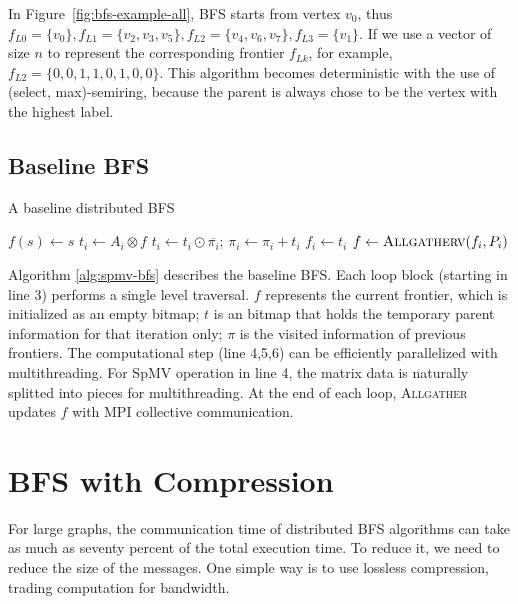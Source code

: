 \documentclass[conference]{IEEEtran}
\begin{document}
In Figure~\ref{fig:bfs-example-all}, BFS
starts from vertex $v_0$, thus $f_{L0}=\{v_0\},
f_{L1}=\{v_2,v_3,v_5\},f_{L2}=\{v_4,v_6,v_7\},f_{L3}=\{v_1\}$. If we use a
vector of size $n$ to represent the corresponding frontier $f_{Lk}$, for
example, $f_{L2}=\{0,0,1,1,0,1,0,0\}$. This algorithm
becomes deterministic with the use of (select, max)-semiring, because the
parent is always chose to be the vertex with the highest label. 

\subsection{Baseline BFS}
\label{sec:baseline-bfs-alg}

\begin{algorithm} [t] \label{alg:spmv-bfs}
\caption{A baseline distributed BFS}
$f(s) \gets s$\;
{
  {
    $t_{i} \gets A_{i} \otimes f $\;
    $t_{i} \gets t_{i} \odot \overline{\pi_{i}}$; $\pi_{i} \gets \pi_{i} + t_{i}$\;
    $f_{i} \gets t_{i}$\;
    $f \gets \textsc{Allgatherv}(f_i,P_i)$\;
  }
}
\end{algorithm}
Algorithm \ref{alg:spmv-bfs} describes the baseline BFS. Each loop block
(starting in line 3) performs a single level traversal. $f$ represents the
current frontier, which is initialized as an empty bitmap; $t$ is an bitmap
that holds the temporary parent information for that iteration only; $\pi$ is
the visited information of previous frontiers. The computational step (line
4,5,6) can be efficiently parallelized with multithreading. For SpMV operation
in line 4, the matrix data is naturally splitted into pieces for
multithreading. At the end of each loop, \textsc{Allgather} updates $f$ with
MPI collective communication.













\section{BFS with Compression}
\label{sec:spmv-bfs}

For large graphs, the communication time of distributed BFS algorithms can
take as much as seventy percent of the total execution time. To reduce it, we
need to reduce the size of the messages. One simple way is to use lossless
compression, trading computation for bandwidth. 
\end{document}
